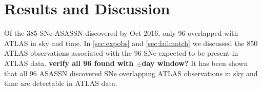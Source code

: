 \documentclass[aps,prb,twocolumn,superscriptaddress]{revtex4-1}
\begin{document}

\section{Results and Discussion}

\indent Of the 385 SNe ASASSN discovered by Oct 2016, only 96 overlapped
with ATLAS in sky and time.  
In \cref{sec:expobs} and \cref{sec:failmatch} we discussed the 850 
ATLAS observations associated with the 96 SNe expected to be 
present in ATLAS data.
{\bf verify all 96 found with $\pm$day window?}
It has been shown that all 96 ASASSN discovered SNe overlapping ATLAS 
observations in sky and time are detectable in ATLAS data.  
\end{document}
